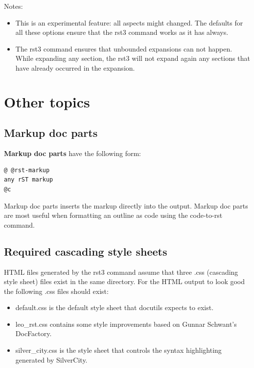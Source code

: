 \documentclass[a4paper,10pt,english]{sphinxmanual}
\begin{document}
Notes:
\begin{itemize}
\item {} 
This is an experimental feature: all aspects might changed. The defaults for
all these options ensure that the rst3 command works as it has always.

\item {} 
The rst3 command ensures that unbounded expansions can not happen. While
expanding any section, the rst3 will not expand again any sections that have
already occurred in the expansion.

\end{itemize}


\section{Other topics}
\label{rstplugin3:other-topics}

\subsection{Markup doc parts}
\label{rstplugin3:markup-doc-parts}
\textbf{Markup doc parts} have the following form:

\begin{Verbatim}[commandchars=\\\{\}]
@ @rst-markup
any rST markup
@c
\end{Verbatim}

Markup doc parts inserts the markup directly into the output. Markup doc parts
are most useful when formatting an outline as code using the code-to-rst
command.


\subsection{Required cascading style sheets}
\label{rstplugin3:required-cascading-style-sheets}
HTML files generated by the rst3 command assume that three .css (cascading style
sheet) files exist in the same directory. For the HTML output to look good the
following .css files should exist:
\begin{itemize}
\item {} 
default.css is the default style sheet that docutils expects to exist.

\item {} 
leo\_rst.css contains some style improvements based on Gunnar Schwant's DocFactory.

\item {} 
silver\_city.css is the style sheet that controls the syntax highlighting generated by SilverCity.

\end{itemize}
\end{document}
